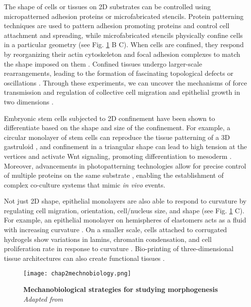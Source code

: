 The shape of cells or tissues on 2D substrates can be controlled using micropatterned adhesion proteins or microfabricated stencils. Protein patterning techniques are used to pattern adhesion promoting proteins and control cell attachment and spreading, while microfabricated stencils physically confine cells in a particular geometry (see Fig. \ref{fig_2_2} B C). When cells are confined, they respond by reorganizing their actin cytoskeleton and focal adhesion complexes to match the shape imposed on them \cite{vignaud2012}. Confined tissues undergo larger-scale rearrangements, leading to the formation of fascinating topological defects or oscillations \cite{tlili2018,  balasubramaniam2021,  guillamat2022}. Through these experiments, we can uncover the mechanisms of force transmission and regulation of collective cell migration and epithelial growth in two dimensions \cite{nelson2005,  vedula2012,  deforet2014}.

Embryonic stem cells subjected to 2D confinement have been shown to differentiate based on the shape and size of the confinement. For example, a circular monolayer of stem cells can reproduce the tissue patterning of a 3D gastruloid \cite{warmflash2014}, and confinement in a triangular shape can lead to high tension at the vertices and activate Wnt signaling, promoting differentiation to mesoderm \cite{muncie2020}. Moreover, advancements in photopatterning technologies allow for precise control of multiple proteins on the same substrate \cite{guyon2021, prahl2022}, enabling the establishment of complex co-culture systems that mimic \textit{in vivo} events.

Not just 2D shape, epithelial monolayers are also able to respond to curvature by regulating cell migration, orientation, cell/nucleus size, and shape \cite{marin-llaurado2022, schamberger2022} (see Fig. \ref{fig_2_2} C). For example, an epithelial monolayer on hemispheres of elastomers acts as a fluid with increasing curvature \cite{tang2022}. On a smaller scale, cells attached to corrugated hydrogels show variations in lamins, chromatin condensation, and cell proliferation rate in response to curvature \cite{luciano2021}. Bio-printing of three-dimensional tissue architectures can also create functional tissues \cite{brassard2021,  breau2022}.

\begin{figure}[h!]
	\centering
	\texttt{[image: chap2mechnobiology.png]}
	\caption{\label{fig_2_2} \textbf{Mechanobiological strategies for studying morphogenesis} \textit{Adapted from \cite{vianello2019}}}
\end{figure}

